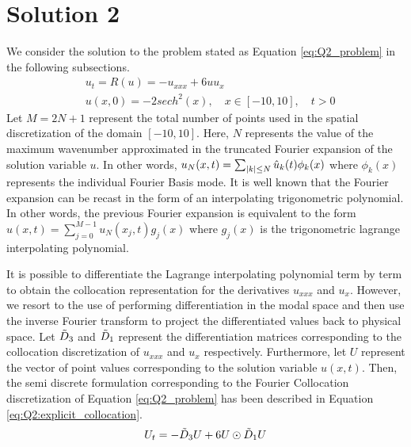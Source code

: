 \documentclass[12pt,dvipsnames]{article}
\DeclarePairedDelimiter\abs{\lvert}{\rvert}
\begin{document}
\section{Solution 2}
We consider the solution to the problem stated as Equation \ref{eq:Q2_problem} in the following subsections.
\begin{equation}
\begin{aligned}
& u_t = R(u) = -u_{xxx} + 6uu_x \\
& u(x, 0) = -2sech^2(x), \quad x \in [-10, 10], \quad t > 0
\end{aligned}
\label{eq:Q2_problem}
\end{equation}
Let $M = 2N + 1$ represent the total number of points used in the spatial discretization of the domain $[-10, 10]$. Here, $N$ represents the value of the maximum wavenumber approximated in the truncated Fourier expansion of the solution variable $u$. In other words, $u_N(x, t) = \sum_{\abs{k} \leq N} \hat{u}_k(t) \phi_k(x)$ where $\phi_k(x)$ represents the individual Fourier Basis mode. It is well known that the Fourier expansion can be recast in the form of an interpolating trigonometric polynomial. In other words, the previous Fourier expansion is equivalent to the form $u(x, t) = \sum_{j = 0}^{M - 1} u_N(x_j, t) g_j(x)$ where $g_j(x)$ is the trigonometric lagrange interpolating polynomial.

It is possible to differentiate the Lagrange interpolating polynomial term by term to obtain the collocation representation for the derivatives $u_{xxx}$ and $u_x$. However, we resort to the use of performing differentiation in the modal space and then use the inverse Fourier transform to project the differentiated values back to physical space. Let $\Tilde{D}_3$ and $\Tilde{D}_1$ represent the differentiation matrices corresponding to the collocation discretization of $u_{xxx}$ and $u_x$ respectively. Furthermore, let $U$ represent the vector of point values corresponding to the solution variable $u(x, t)$. Then, the semi discrete formulation corresponding to the Fourier Collocation discretization of Equation \ref{eq:Q2_problem} has been described in Equation \ref{eq:Q2:explicit_collocation}.
\begin{equation}
\begin{aligned}
    U_t = -\Tilde{D}_3 U + 6U \odot \Tilde{D}_1 U
\end{aligned}
\label{eq:Q2:explicit_collocation}     
\end{equation}
\end{document}
